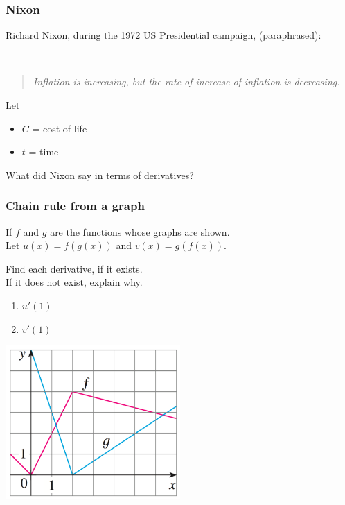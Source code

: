 \documentclass[14pt]{beamer}
\begin{document}


\begin{frame}
\frametitle{Nixon}


Richard Nixon, during the 1972 US Presidential campaign, (paraphrased):

\
\begin{quote}
\emph{Inflation is increasing, but the rate of increase of inflation is decreasing.}
\end{quote}

\vfill

Let 
	\begin{itemize}
		\item $C$ = cost of life
		\item  $t$ = time
	\end{itemize}
What did Nixon say in terms of derivatives?

\vfill

\end{frame}

\begin{frame}
\frametitle{Chain rule from a graph}


If $f$ and $g$ are the functions whose graphs are shown. \\
Let $u(x)=f(g(x))$ and $v(x)=g(f(x))$. \\ \medskip

Find each derivative, if it exists. \\ If it does not exist, explain why.


\begin{enumerate}
\item $u'(1)$
\item $v'(1)$
\end{enumerate}
\vspace{-1cm}


\begin{center}
\includegraphics[width=0.5\textwidth]{G10}
\end{center}

\end{frame}
\end{document}
